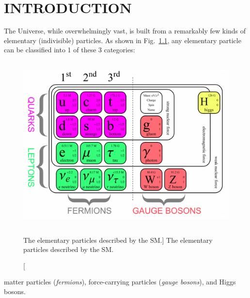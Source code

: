 \chapter{INTRODUCTION}
\label{ch:intro}
The Universe, while overwhelmingly vast, is built from a remarkably few kinds of elementary
(\ie indivisible) particles.
As shown in Fig.~\ref{fig:particular_table}, any elementary particle can be classified into 1 of these 3 categories:
\begin{figure}[!b]
    \centering
    \includegraphics[height=9cm,keepaspectratio]{figures/sm/particular_table_updated.png}
        \caption
            [The elementary particles described by the SM.]
            {The elementary particles described by the SM.}
        \label{fig:particular_table}
\end{figure}
matter particles (\emph{fermions}), force-carrying particles (\emph{gauge bosons}), and Higgs bosons.
